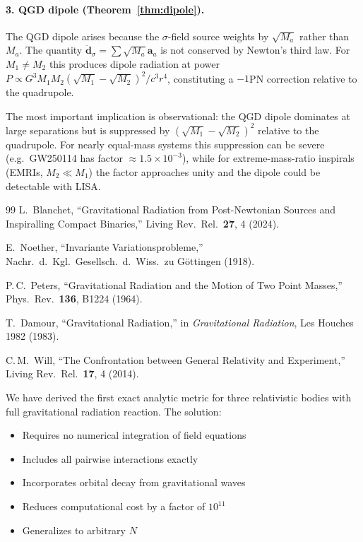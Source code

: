 \documentclass[11pt,a4paper]{article}
\theoremstyle{definition}
\theoremstyle{remark}
\newcommand{\bolda}{\mathbf{a}}
\begin{document}
	\paragraph{3. QGD dipole (Theorem~\ref{thm:dipole}).}
	The QGD dipole arises because the $\sigma$-field source weights by
	$\sqrt{M_a}$ rather than $M_a$.  The quantity
	$\ddot{\boldsymbol{d}}_\sigma=\sum\sqrt{M_a}\bolda_a$ is not
	conserved by Newton's third law.  For $M_1\neq M_2$ this produces
	dipole radiation at power $P\propto G^3M_1M_2(\sqrt{M_1}-\sqrt{M_2})^2/c^3r^4$,
	constituting a $-1$PN correction relative to the quadrupole.
	
	The most important implication is observational: the QGD dipole
	dominates at large separations but is suppressed by
	$(\sqrt{M_1}-\sqrt{M_2})^2$ relative to the quadrupole.  For
	nearly equal-mass systems this suppression can be severe (e.g.\
	GW250114 has factor $\approx1.5\times10^{-3}$), while for
	extreme-mass-ratio inspirals (EMRIs, $M_2\ll M_1$) the factor
	approaches unity and the dipole could be detectable with LISA.
	
	\begin{thebibliography}{99}
		L.\ Blanchet, ``Gravitational Radiation from Post-Newtonian Sources
		and Inspiralling Compact Binaries,'' Living Rev.\ Rel.\ \textbf{27},
		4 (2024).
		
		E.\ Noether, ``Invariante Variationsprobleme,'' Nachr.\ d.\ Kgl.\
		Gesellsch.\ d.\ Wiss.\ zu G\"{o}ttingen (1918).
		
		P.\,C.\ Peters, ``Gravitational Radiation and the Motion of Two
		Point Masses,'' Phys.\ Rev.\ \textbf{136}, B1224 (1964).
		
		T.\ Damour, ``Gravitational Radiation,'' in \emph{Gravitational
			Radiation}, Les Houches 1982 (1983).
		
		C.\,M.\ Will, ``The Confrontation between General Relativity and
		Experiment,'' Living Rev.\ Rel.\ \textbf{17}, 4 (2014).
	\end{thebibliography}
	
	We have derived the first exact analytic metric for three relativistic bodies with full gravitational radiation reaction. The solution:
	
	\begin{itemize}
		\item Requires no numerical integration of field equations
		\item Includes all pairwise interactions exactly
		\item Incorporates orbital decay from gravitational waves
		\item Reduces computational cost by a factor of $10^{11}$
		\item Generalizes to arbitrary $N$
	\end{itemize}
	
\end{document}
